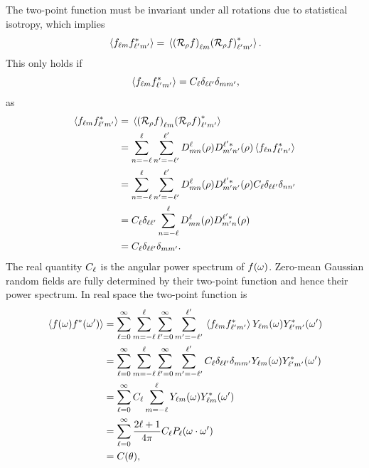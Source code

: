 The two-point function must be invariant under all rotations due to statistical isotropy, which implies
%
\begin{equation}
	\expval*{\harmonic{f} \conj{\harmonic[']{f}}}
	= \expval*{\harmonic{(\rotation{\rho}f)}\conj{\harmonic[']{(\rotation{\rho}f)}}}.
\end{equation}
%
This only holds if
%
\begin{equation}
	\expval*{\harmonic{f} \conj{\harmonic[']{f}}}
	= \powerSpectrum \delta_{\ell\ell'} \delta_{m m'},
\end{equation}
%
as
%
\begin{align}
	\expval*{\harmonic{f} \conj{\harmonic[']{f}}}
	 & = \expval*{\harmonic{(\rotation{\rho}f)}\conj{\harmonic[']{(\rotation{\rho}f)}}} \nonumber{}                                                         \\
	 & = \wignerSum \wignerSum['] \wigner{\ell}{m}{n}(\rho) \wigner[\ast]{\ell'}{m'}{n'}(\rho) \expval*{f_{\ell n} \conj{f_{\ell' n'}}} \nonumber{}         \\
	 & = \wignerSum \wignerSum['] \wigner{\ell}{m}{n}(\rho) \wigner[\ast]{\ell'}{m'}{n'}(\rho) \powerSpectrum \delta_{\ell \ell'} \delta_{n n'} \nonumber{} \\
	 & = \powerSpectrum \delta_{\ell\ell'} \wignerSum \wigner{\ell}{m}{n}(\rho) \wigner[\ast]{\ell'}{m'}{n}(\rho) \nonumber{}                               \\
	 & = \powerSpectrum \delta_{\ell\ell'} \delta_{m m'}.
\end{align}
%
The real quantity \(\powerSpectrum{}\) is the angular power spectrum of \(\pixel{f}\).
Zero-mean Gaussian random fields are fully determined by their two-point function and hence their power spectrum.
In real space the two-point function is
%
\begin{align}
	\expval*{f(\omega) \conj{f}(\omega')}
	 & = \sum\limits_{\ell=0}^{\infty} \sum\limits_{m=-\ell}^{\ell} \sum\limits_{\ell'=0}^{\infty} \sum\limits_{m'=-\ell'}^{\ell'} \expval*{\harmonic{f} \conj{\harmonic[']{f}}} \harmonic{Y}(\omega) \conj{\harmonic[']{Y}}(\omega') \nonumber{}   \\
	 & = \sum\limits_{\ell=0}^{\infty} \sum\limits_{m=-\ell}^{\ell} \sum\limits_{\ell'=0}^{\infty} \sum\limits_{m'=-\ell'}^{\ell'} \powerSpectrum \delta_{\ell\ell'} \delta_{m m'} \harmonic{Y}(\omega) \conj{\harmonic[']{Y}}(\omega') \nonumber{} \\
	 & = \sum\limits_{\ell=0}^{\infty} \powerSpectrum \sum\limits_{m=-\ell}^{\ell} \harmonic{Y}(\omega) \conj{\harmonic{Y}}(\omega') \nonumber{}                                                                                                    \\
	 & = \sum\limits_{\ell=0}^{\infty} \factor \powerSpectrum P_{\ell}(\omega\cdot\omega')  \nonumber{}                                                                                                                                             \\
	 & = C(\theta),
\end{align}
